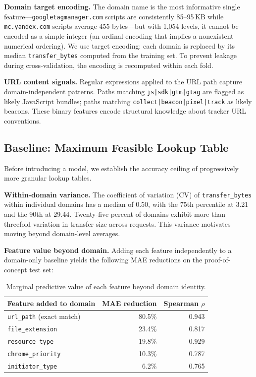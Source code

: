 \documentclass[11pt]{article}
\begin{document}
\textbf{Domain target encoding.} The domain name is the most informative single feature---\texttt{googletagmanager.com} scripts are consistently 85--95\,KB while \texttt{mc.yandex.com} scripts average 455 bytes---but with 1,054 levels, it cannot be encoded as a simple integer (an ordinal encoding that implies a nonexistent numerical ordering). We use target encoding: each domain is replaced by its median \texttt{transfer\_bytes} computed from the training set. To prevent leakage during cross-validation, the encoding is recomputed within each fold.

\textbf{URL content signals.} Regular expressions applied to the URL path capture domain-independent patterns. Paths matching \texttt{\.js|sdk|gtm|gtag} are flagged as likely JavaScript bundles; paths matching \texttt{collect|beacon|pixel|track} as likely beacons. These binary features encode structural knowledge about tracker URL conventions.

\subsection{Baseline: Maximum Feasible Lookup Table}
\label{sec:lut-baseline}

Before introducing a model, we establish the accuracy ceiling of progressively more granular lookup tables.

\textbf{Within-domain variance.} The coefficient of variation (CV) of \texttt{transfer\_bytes} within individual domains has a median of 0.50, with the 75th percentile at 3.21 and the 90th at 29.44. Twenty-five percent of domains exhibit more than threefold variation in transfer size across requests. This variance motivates moving beyond domain-level averages.

\textbf{Feature value beyond domain.} Adding each feature independently to a domain-only baseline yields the following MAE reductions on the proof-of-concept test set:

\begin{table}[h]
\centering
\small
\begin{tabular}{lrr}
\toprule
Feature added to domain & MAE reduction & Spearman $\rho$ \\
\midrule
\texttt{url\_path} (exact match) & 80.5\% & 0.943 \\
\texttt{file\_extension} & 23.4\% & 0.817 \\
\texttt{resource\_type} & 19.8\% & 0.929 \\
\texttt{chrome\_priority} & 10.3\% & 0.787 \\
\texttt{initiator\_type} & 6.2\% & 0.765 \\
\bottomrule
\end{tabular}
\caption{Marginal predictive value of each feature beyond domain identity.}
\label{tab:feature-value}
\end{table}
\end{document}
